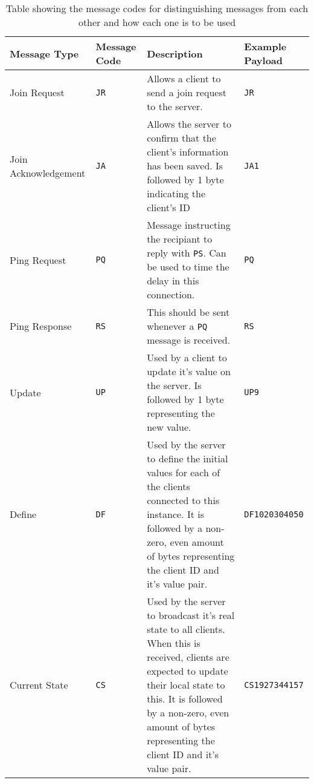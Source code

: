 \begin{table}[!h]
  \centering
  \begin{tabular}{ l l p{} l }
    \toprule
    Message Type & Message Code & Description & Example Payload \\
    \midrule
    Join Request &
      \lstinline[]$JR$ &
      Allows a client to send a join request to the server. &
      \lstinline[]$JR$ \\
    \addlinespace[10pt]
    Join Acknowledgement &
      \lstinline[]$JA$ &
      Allows the server to confirm that the client's information has been saved. Is followed by 1 byte indicating the client's ID &
      \lstinline[]$JA1$ \\
    \addlinespace[10pt]
    Ping Request &
      \lstinline[]$PQ$ &
      Message instructing the recipiant to reply with \lstinline[]$PS$. Can be used to time the delay in this connection.&
      \lstinline[]$PQ$ \\
    \addlinespace[10pt]
    Ping Response &
      \lstinline[]$RS$ &
      This should be sent whenever a \lstinline[]$PQ$ message is received. &
      \lstinline[]$RS$ \\
    \addlinespace[10pt]
    Update &
      \lstinline[]$UP$ &
      Used by a client to update it's value on the server. Is followed by 1 byte representing the new value. &
      \lstinline[]$UP9$ \\
    \addlinespace[10pt]
    Define &
      \lstinline[]$DF$ &
      Used by the server to define the initial values for each of the clients connected to this instance. It is followed by a non-zero, even amount of bytes representing the client ID and it's value pair. &
      \lstinline[]$DF1020304050$ \\
    \addlinespace[10pt]
    Current State &
      \lstinline[]$CS$ &
      Used by the server to broadcast it's real state to all clients. When this is received, clients are expected to update their local state to this. It is followed by a non-zero, even amount of bytes representing the client ID and it's value pair. &
      \lstinline[]$CS1927344157$ \\

    \bottomrule
  \end{tabular}
  \caption{Table showing the message codes for distinguishing messages from each other and how each one is to be used}
  \label{table:message-codes}
\end{table}
